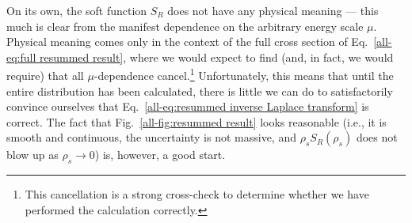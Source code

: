 \documentclass[../thesis.tex]{subfiles}
\begin{document}
	On its own, the soft function $S_R$ does not have any physical meaning --- this much is clear from the manifest dependence on the arbitrary energy scale $\mu$. Physical meaning comes only in the context of the full cross section of Eq.~\ref{all-eq:full resummed result}, where we would expect to find (and, in fact, we would require) that all $\mu$-dependence cancel.\footnote{This cancellation is a strong cross-check to determine whether we have performed the calculation correctly.} Unfortunately, this means that until the entire distribution has been calculated, there is little we can do to satisfactorily convince ourselves that Eq.~\ref{all-eq:resummed inverse Laplace transform} is correct. The fact that Fig.~\ref{all-fig:resummed result} looks reasonable (i.e., it is smooth and continuous, the uncertainty is not massive, and $\rho_s S_R(\rho_s)$ does not blow up as $\rho_s \to 0$) is, however, a good start.


%  
% 
\end{document}
